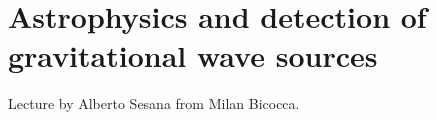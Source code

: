\documentclass[main.tex]{subfiles}
\begin{document}
\section{Astrophysics and detection of gravitational wave sources}


Lecture by Alberto Sesana from Milan Bicocca.
\end{document}
